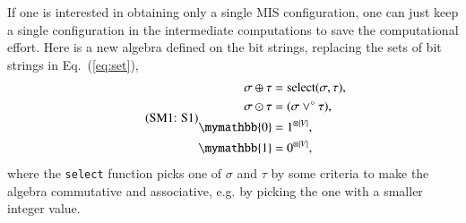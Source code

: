 \documentclass[onefignum, onetabnum]{siamart190516}
\newcommand{\eqname}[1]{\stepcounter{equation}\tag{\theequation : #1}}
\newcommand{\<}{\langle}
\renewcommand{\>}{\rangle}
\newcommand{\Eq}[1]{Eq.~(\ref{#1})}
\newcommand{\App}[1]{Appendix~\ref{#1}}
\begin{document}
If one is interested in obtaining only a single MIS configuration, one can just keep a single configuration in the intermediate computations to save the computational effort.
Here is a new algebra defined on the bit strings, replacing the sets of bit strings in \Eq{eq:set}, 
%
\begin{equation}
\eqname{S1}
\begin{split}
    \sigma \oplus \tau &= {\rm select}(\sigma, \tau), \\
    \sigma \odot \tau &= (\sigma\lor^\circ \tau),\\
    \mymathbb{0} &= 1^{\otimes |V|}, \\
    \mymathbb{1} &= 0^{\otimes |V|},
\end{split}\label{eq:singleconfig}
\end{equation}
where the \texttt{select} function picks one of $\sigma$ and $\tau$ by some criteria to make the algebra commutative and associative, e.g. by picking the one with a smaller integer value.

\end{document}
